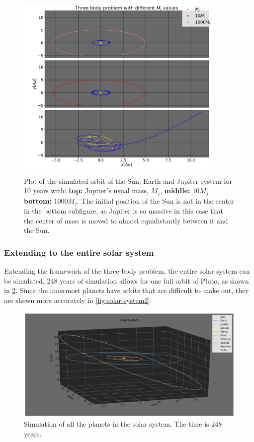 \documentclass[../main.tex]{subfiles}
\begin{document}
\begin{figure}[htb!]
    \centering
    \includegraphics[width=0.9\textwidth]{../figures/three_body_problem.pdf}
    \caption{Plot of the simulated orbit of the Sun, Earth and Jupiter system for 10 years with: \textbf{top:} Jupiter's usual mass, $M_j$, \textbf{middle:} $10M_j$ \textbf{bottom:} $1000M_j$. The initial position of the Sun is not in the center in the bottom subfigure, as Jupiter is so massive in this case that the center of mass is moved to almost equidistantly between it and the Sun.}
    \label{fig:three-body-problem}
\end{figure}

\subsubsection{Extending to the entire solar system}

Extending the framework of the three-body problem, the entire solar system can be simulated. 248 years of simulation allows for one full orbit of Pluto, as shown in \cref{fig:solar-system1}. Since the innermost planets have orbits that are difficult to make out, they are shown more accurately in \cref{fig:solar-system2}.

\begin{figure}[htb!]
    \centering
    \includegraphics[trim=5.cm 0.cm 0.cm 0.cm, clip,width=\textwidth]{../figures/solar_system1.pdf}
    \caption{Simulation of all the planets in the solar system. The time is 248 years.}
    \label{fig:solar-system1}
\end{figure}
\end{document}
